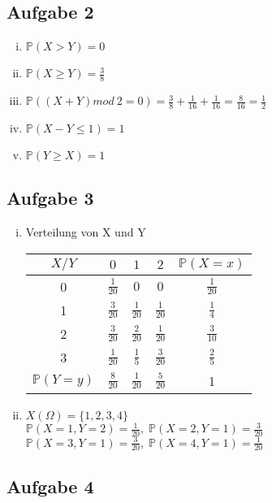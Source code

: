 \documentclass[10pt,a4paper,parskip=half]{scrartcl}
\begin{document}
\subsection*{Aufgabe 2}
\begin{enumerate}[(i)]
\item
$\mathbb{P}(X > Y) = 0$
\item
$\mathbb{P}(X \geq Y) = \frac{3}{8}$
\item
$\mathbb{P}((X + Y ) mod \: 2 = 0) = \frac{3}{8} + \frac{1}{16} + \frac{1}{16} = \frac{8}{16} = \frac{1}{2}$
\item
$\mathbb{P}(X - Y \leq 1) = 1$
\item
$\mathbb{P}(Y \geq X) = 1$
\end{enumerate}

\subsection*{Aufgabe 3}
\begin{enumerate}[(i)]
\item
Verteilung von X und Y
\begin{tabular}{c | c c c | c}
$X/Y$ & $0$ & $1$ & $2$ & $\mathbb{P}(X=x) $\\ \hline
0 & $\frac{1}{20}$ & $0$ & $0$ & $\frac{1}{20}$ \\
1 & $\frac{3}{20}$ & $\frac{1}{20}$ & $\frac{1}{20}$ & $\frac{1}{4}$ \\
2 & $\frac{3}{20}$ & $\frac{2}{20}$ & $\frac{1}{20}$ & $\frac{3}{10}$ \\
3 & $\frac{1}{20}$ & $\frac{1}{5}$ & $\frac{3}{20}$ & $\frac{2}{5}$ \\ \hline
$\mathbb{P}(Y=y)$ & $\frac{8}{20}$ & $\frac{1}{20}$ & $\frac{5}{20}$ & 1
\end{tabular}
\item
$X(\Omega) = \{1,2,3,4\}$ \\
$\mathbb{P}(X=1, Y=2) = \frac{1}{20}, \; \mathbb{P}(X=2, Y=1) = \frac{3}{20}$ \\
$\mathbb{P}(X=3, Y=1) = \frac{3}{20}, \; \mathbb{P}(X=4, Y=1) = \frac{1}{20}$
\end{enumerate}

\subsection*{Aufgabe 4}
\end{document}
